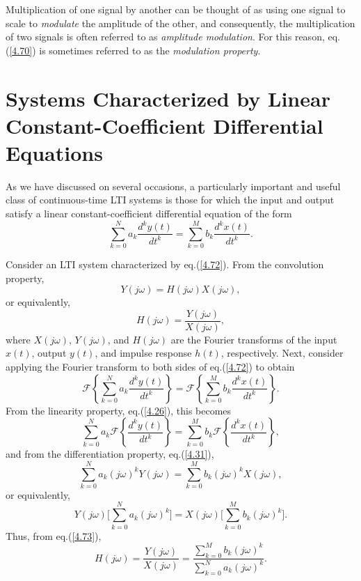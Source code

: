 \documentclass[a4paper,twoside]{book}
\begin{document}
Multiplication of one signal by another can be thought of as using one signal to scale to \textit{modulate} the amplitude of the other, and consequently, the multiplication of two signals is often referred to as \textit{amplitude modulation}. For this reason, eq.\;(\ref{4.70}) is sometimes referred to as the \textit{modulation property}.

\section{Systems Characterized by Linear Constant-Coefficient Differential Equations}

As we have discussed on several occasions, a particularly important and useful class of continuous-time LTI systems is those for which the input and output satisfy a linear constant-coefficient differential equation of the form
\begin{equation}
    \sum_{k=0}^Na_k\frac{d^ky(t)}{dt^k}=\sum_{k=0}^Mb_k\frac{d^kx(t)}{dt^k}.
    \label{4.72}
\end{equation}

Consider an LTI system characterized by eq.\;(\ref{4.72}). From the convolution property, $$Y(j\omega)=H(j\omega)X(j\omega),$$ or equivalently,
\begin{equation}
    H(j\omega)=\frac{Y(j\omega)}{X(j\omega)},
    \label{4.73}
\end{equation}
where $X(j\omega)$, $Y(j\omega)$, and $H(j\omega)$ are the Fourier transforms of the input $x(t)$, output $y(t)$, and impulse response $h(t)$, respectively. Next, consider applying the Fourier transform to both sides of eq.\;(\ref{4.72}) to obtain
\begin{equation}
    \mathcal{F}\left\{\sum_{k=0}^Na_k\frac{d^ky(t)}{dt^k}\right\} = \mathcal{F}\left\{\sum_{k=0}^Mb_k\frac{d^kx(t)}{dt^k}\right\}.
    \label{4.74}
\end{equation}
From the linearity property, eq.\;(\ref{4.26}), this becomes
\begin{equation}
    \sum_{k=0}^Na_k\mathcal{F}\left\{\frac{d^ky(t)}{dt^k}\right\} = \sum_{k=0}^Mb_k\mathcal{F}\left\{\frac{d^kx(t)}{dt^k}\right\} ,
    \label{4.75}
\end{equation}
and from the differentiation property, eq.\;(\ref{4.31}), $$\sum_{k=0}^Na_k(j\omega)^kY(j\omega)=\sum_{k=0}^Mb_k(j\omega)^kX(j\omega),$$ or equivalently, $$Y(j\omega)\biggl[\sum_{k=0}^Na_k(j\omega)^k\biggr]=X(j\omega)\biggl[\sum_{k=0}^Mb_k(j\omega)^k\biggr].$$ Thus, from eq.\;(\ref{4.73}),
\begin{equation}
    H(j\omega)=\frac{Y(j\omega)}{X(j\omega)}=\frac{\sum_{k=0}^{M}b_{k}(j\omega)^{k}}{\sum_{k=0}^{N}a_{k}(j\omega)^{k}}.
    \label{4.76}
\end{equation}
\end{document}
